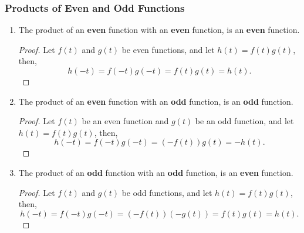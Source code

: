 \documentclass{article}
\begin{document}
\subsubsection{Products of Even and Odd Functions}
\begin{enumerate}
    \item The product of an \textbf{even} function with an
          \textbf{even} function, is an \textbf{even} function.
          \begin{proof}
              Let \(f\left( t \right)\) and \(g\left( t \right)\) be even
              functions, and let \(h\left( t \right) = f\left( t \right)
              g\left( t \right)\), then,
              \begin{equation*}
                  h\left( -t \right) = f\left( -t \right) g\left( -t \right) = f\left( t \right) g\left( t \right) = h\left( t \right).
              \end{equation*}
          \end{proof}
    \item The product of an \textbf{even} function with an \textbf{odd}
          function, is an \textbf{odd} function.
          \begin{proof}
              Let \(f\left( t \right)\) be an even function and \(g\left( t
              \right)\) be an odd function, and let \(h\left( t \right) =
              f\left( t \right) g\left( t \right)\), then,
              \begin{equation*}
                  h\left( -t \right) = f\left( -t \right) g\left( -t \right) = \left( -f\left( t \right) \right) g\left( t \right) = -h\left( t \right).
              \end{equation*}
          \end{proof}
    \item The product of an \textbf{odd} function with an \textbf{odd}
          function, is an \textbf{even} function.
          \begin{proof}
              Let \(f\left( t \right)\) and \(g\left( t \right)\) be odd
              functions, and let \(h\left( t \right) = f\left( t \right)
              g\left( t \right)\), then,
              \begin{equation*}
                  h\left( -t \right) = f\left( -t \right) g\left( -t \right) = \left( -f\left( t \right) \right) \left( -g\left( t \right) \right) = f\left( t \right) g\left( t \right) = h\left( t \right).
              \end{equation*}
          \end{proof}
\end{enumerate}
\end{document}
